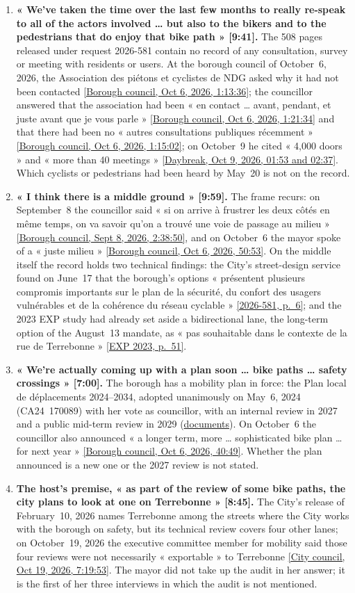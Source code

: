 \documentclass[11pt,letterpaper]{article}
\newcommand{\repourl}{https://github.com/OpenMobilityData/Terrebonne-open-sources}
\newcommand{\doc}[2]{\href{\repourl/blob/main/#1}{#2}}
\newcommand{\pagesurl}{https://openmobilitydata.github.io/Terrebonne-access-requests}
\newcommand{\cliptime}[1]{\textsf{\small[#1]}}
\newcommand{\pgl}[2]{\href{\pagesurl/2026-581/raw/01_emails_mandate_counts.pdf\#page=#1}{\textsf{\small[2026-581, p.~#2]}}}
\newcommand{\pg}[1]{\pgl{#1}{#1}}
\newcommand{\exppg}[1]{\href{\repourl/blob/main/2023-exp-mobility-study/raw/EXP_Etude_de_mobilite_rue_de_Terrebonne_2023.pdf}{\textsf{\small[EXP 2023, p.~#1]}}}
\newcommand{\tr}[1]{\href{\repourl/blob/main/2026-10-19-city-council/2026-10-19_03.md}{\textsf{\small[City council, Oct 19, 2026, #1]}}}
\newcommand{\octsix}[2]{\href{\repourl/blob/main/2026-10-06-borough-council/derived/#1}{\textsf{\small[Borough council, Oct 6, 2026, #2]}}}
\newcommand{\septeight}[1]{\href{\repourl/blob/main/2026-09-08-borough-council/}{\textsf{\small[Borough council, Sept 8, 2026, #1]}}}
\newcommand{\dbocttime}[1]{\href{\repourl/blob/main/2026-cbc-daybreak-interview/}{\textsf{\small[Daybreak, Oct 9, 2026, #1]}}}
\begin{document}
\begin{enumerate}[nosep]
\item \textbf{« We've taken the time over the last few months to really re-speak to all of the actors involved … but also to the bikers and to the pedestrians that do enjoy that bike path » \cliptime{9:41}.} The 508 pages released under request 2026-581 contain no record of any consultation, survey or meeting with residents or users. At the borough council of October~6, 2026, the Association des piétons et cyclistes de NDG asked why it had not been contacted \octsix{2026-10-06_02.md}{1:13:36}; the councillor answered that the association had been « en contact … avant, pendant, et juste avant que je vous parle » \octsix{2026-10-06_02.md}{1:21:34} and that there had been no « autres consultations publiques récemment » \octsix{2026-10-06_02.md}{1:15:02}; on October~9 he cited « 4,000 doors » and « more than 40 meetings » \dbocttime{01:53 and 02:37}. Which cyclists or pedestrians had been heard by May~20 is not on the record.
\item \textbf{« I think there is a middle ground » \cliptime{9:59}.} The frame recurs: on September~8 the councillor said « si on arrive à frustrer les deux côtés en même temps, on va savoir qu'on a trouvé une voie de passage au milieu » \septeight{2:38:50}, and on October~6 the mayor spoke of a « juste milieu » \octsix{2026-10-06_07.md}{50:53}. On the middle itself the record holds two technical findings: the City's street-design service found on June~17 that the borough's options « présentent plusieurs compromis importants sur le plan de la sécurité, du confort des usagers vulnérables et de la cohérence du réseau cyclable » \pg{6}; and the 2023 EXP study had already set aside a bidirectional lane, the long-term option of the August~13 mandate, as « pas souhaitable dans le contexte de la rue de Terrebonne » \exppg{51}.
\item \textbf{« We're actually coming up with a plan soon … bike paths … safety crossings » \cliptime{7:00}.} The borough has a mobility plan in force: the Plan local de déplacements 2024--2034, adopted unanimously on May~6, 2024 (CA24~170089) with her vote as councillor, with an internal review in 2027 and a public mid-term review in 2029 (\doc{2024-cdn-ndg-pld/}{documents}). On October~6 the councillor also announced « a longer term, more … sophisticated bike plan … for next year » \octsix{2026-10-06_01.md}{40:49}. Whether the plan announced is a new one or the 2027 review is not stated.
\item \textbf{The host's premise, « as part of the review of some bike paths, the city plans to look at one on Terrebonne » \cliptime{8:45}.} The City's release of February~10, 2026 names Terrebonne among the streets where the City works with the borough on safety, but its technical review covers four other lanes; on October~19, 2026 the executive committee member for mobility said those four reviews were not necessarily « exportable » to Terrebonne \tr{7:19:53}. The mayor did not take up the audit in her answer; it is the first of her three interviews in which the audit is not mentioned.
\end{enumerate}
\end{document}

